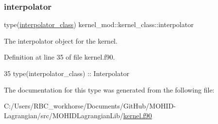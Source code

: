\subsubsection{\texorpdfstring{interpolator}{interpolator}}
{\footnotesize\ttfamily type(\mbox{\hyperlink{structinterpolator__mod_1_1interpolator__class}{interpolator\+\_\+class}}) kernel\+\_\+mod\+::kernel\+\_\+class\+::interpolator}



The interpolator object for the kernel. 



Definition at line 35 of file kernel.\+f90.


\begin{DoxyCode}
35         \textcolor{keywordtype}{type}(interpolator\_class) :: Interpolator
\end{DoxyCode}


The documentation for this type was generated from the following file\+:\begin{DoxyCompactItemize}
\item 
C\+:/\+Users/\+R\+B\+C\+\_\+workhorse/\+Documents/\+Git\+Hub/\+M\+O\+H\+I\+D-\/\+Lagrangian/src/\+M\+O\+H\+I\+D\+Lagrangian\+Lib/\mbox{\hyperlink{kernel_8f90}{kernel.\+f90}}\end{DoxyCompactItemize}
